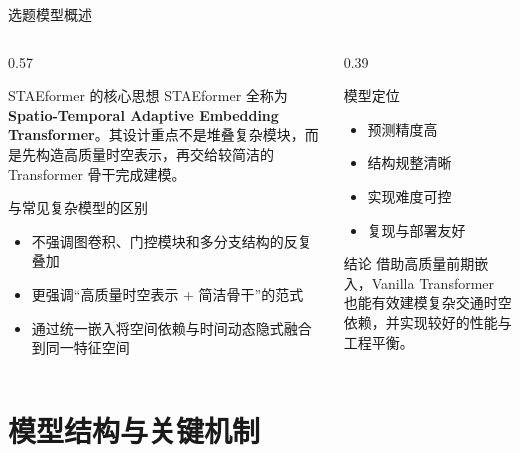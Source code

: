 \documentclass[10pt,aspectratio=169]{ctexbeamer}
\begin{document}
\begin{frame}{选题模型概述}
  \begin{columns}[T]
    \begin{column}{0.57\textwidth}
      \begin{block}{STAEformer 的核心思想}
        STAEformer 全称为 \textbf{Spatio-Temporal Adaptive Embedding Transformer}。其设计重点不是堆叠复杂模块，而是先构造高质量时空表示，再交给较简洁的 Transformer 骨干完成建模。
      \end{block}

      \begin{exampleblock}{与常见复杂模型的区别}
        \begin{itemize}\setlength{\itemsep}{2pt}
          \item 不强调图卷积、门控模块和多分支结构的反复叠加
          \item 更强调“高质量时空表示 + 简洁骨干”的范式
          \item 通过统一嵌入将空间依赖与时间动态隐式融合到同一特征空间
        \end{itemize}
      \end{exampleblock}
    \end{column}
    \begin{column}{0.39\textwidth}
      \begin{alertblock}{模型定位}
        \begin{itemize}\setlength{\itemsep}{2pt}
          \item 预测精度高
          \item 结构规整清晰
          \item 实现难度可控
          \item 复现与部署友好
        \end{itemize}
      \end{alertblock}

      \begin{block}{结论}
        借助高质量前期嵌入，Vanilla Transformer 也能有效建模复杂交通时空依赖，并实现较好的性能与工程平衡。
      \end{block}
    \end{column}
  \end{columns}
\end{frame}

\section{模型结构与关键机制}
\end{document}
